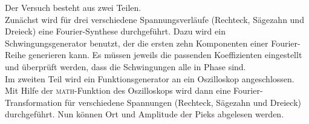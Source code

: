 Der Versuch besteht aus zwei Teilen. \\
Zunächst wird für drei verschiedene Spannungsverläufe (Rechteck, Sägezahn und Dreieck) eine Fourier-Synthese durchgeführt. Dazu wird ein Schwingungsgenerator benutzt, der die ersten zehn Komponenten einer Fourier-Reihe generieren kann. Es müssen jeweils die passenden Koeffizienten eingestellt und überprüft werden, dass die Schwingungen alle in Phase sind. \\
Im zweiten Teil wird ein Funktionsgenerator an ein Oszilloskop angeschlossen. Mit Hilfe der \textsc{math}-Funktion des Oszilloskops wird dann eine Fourier-Transformation für verschiedene Spannungen (Rechteck, Sägezahn und Dreieck) durchgeführt. Nun können Ort und Amplitude der Pieks abgelesen werden.